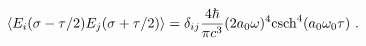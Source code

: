 \begin{equation}\label{ct99-10}
\langle E_{i}(\sigma -\tau/2)E_{j}(\sigma +\tau/2)\rangle =\delta _{ij}\frac{4\hbar}{\pi c^3}(2a_0\omega)^4{\rm csch}^4 (a_0\omega _0 \tau)~.
\end{equation}

